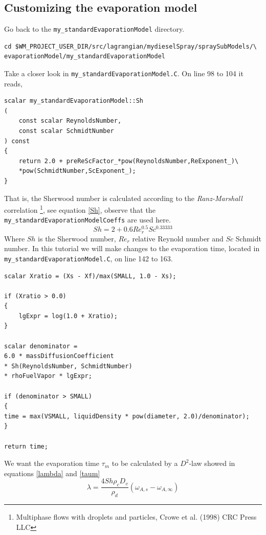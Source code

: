 \documentclass{report}
\begin{document}
\subsection{Customizing the evaporation model}
Go back to the \verb+my_standardEvaporationModel+ directory.
\begin{verbatim}
cd $WM_PROJECT_USER_DIR/src/lagrangian/mydieselSpray/spraySubModels/\
evaporationModel/my_standardEvaporationModel
\end{verbatim} 
Take a closer look in \verb+my_standardEvaporationModel.C+. On line 98 to 104 it reads,
\begin{verbatim}
scalar my_standardEvaporationModel::Sh
(
    const scalar ReynoldsNumber,
    const scalar SchmidtNumber
) const
{
    return 2.0 + preReScFactor_*pow(ReynoldsNumber,ReExponent_)\ 
    *pow(SchmidtNumber,ScExponent_);
}
\end{verbatim} 
That is, the Sherwood number is calculated according to the \textit{Ranz-Marshall} correlation \footnote{Multiphase flows with droplets and particles, Crowe et al. (1998) CRC Press LLC}, see equation \ref{Sh}, observe that the \verb+my_standardEvaporationModelCoeffs+ are used here.
\begin{equation}
\label{Sh}
	Sh=2+0.6Re_{r}^{0.5}Sc^{0.33333}
\end{equation}
Where $Sh$ is the Sherwood number, $Re_{r}$ relative Reynold number and $Sc$ Schmidt number.
\newline
\noindent
In this tutorial we will make changes to the evaporation time, located in \newline\noindent
\verb+my_standardEvaporationModel.C+, on line 142 to 163. 
\begin{verbatim}
scalar Xratio = (Xs - Xf)/max(SMALL, 1.0 - Xs);

if (Xratio > 0.0)
{
    lgExpr = log(1.0 + Xratio);
}

scalar denominator =
6.0 * massDiffusionCoefficient
* Sh(ReynoldsNumber, SchmidtNumber)
* rhoFuelVapor * lgExpr;

if (denominator > SMALL)
{
time = max(VSMALL, liquidDensity * pow(diameter, 2.0)/denominator);
}

return time;
\end{verbatim}
We want the evaporation time $\tau_{m}$ to be calculated by a $D^2$-law showed in equations \ref{lambda} and \ref{taum}
\begin{equation}
\label{lambda}
	\lambda =\frac{4Sh \rho_{c} D_v}{\rho_{d}} \left( \omega_{A,s}-\omega_{A,\infty} \right)
\end{equation}
\end{document}
